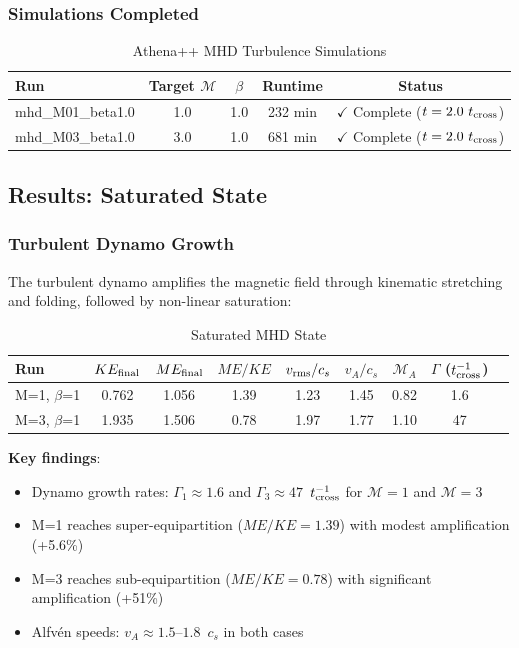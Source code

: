 \documentclass[11pt,a4paper]{article}
\begin{document}
\subsubsection{Simulations Completed}

\begin{table}[H]
\centering
\caption{Athena++ MHD Turbulence Simulations}
\begin{tabular}{lcccc}
\toprule
Run & Target $\mathcal{M}$ & $\beta$ & Runtime & Status \\
\midrule
mhd\_M01\_beta1.0 & 1.0 & 1.0 & 232 min & $\checkmark$ Complete ($t = 2.0~t_{\rm cross}$) \\
mhd\_M03\_beta1.0 & 3.0 & 1.0 & 681 min & $\checkmark$ Complete ($t = 2.0~t_{\rm cross}$) \\
\bottomrule
\end{tabular}
\end{table}

\subsection{Results: Saturated State}

\subsubsection{Turbulent Dynamo Growth}

The turbulent dynamo amplifies the magnetic field through kinematic stretching and folding, followed by non-linear saturation:

\begin{table}[H]
\centering
\caption{Saturated MHD State}
\begin{tabular}{lcccccccc}
\toprule
Run & $KE_{\rm final}$ & $ME_{\rm final}$ & $ME/KE$ & $v_{\rm rms}/c_s$ & $v_A/c_s$ & $\mathcal{M}_A$ & $\Gamma$ ($t_{\rm cross}^{-1}$) \\
\midrule
M=1, $\beta$=1 & 0.762 & 1.056 & 1.39 & 1.23 & 1.45 & 0.82 & 1.6 \\
M=3, $\beta$=1 & 1.935 & 1.506 & 0.78 & 1.97 & 1.77 & 1.10 & 47 \\
\bottomrule
\end{tabular}
\end{table}

\textbf{Key findings}:
\begin{itemize}
    \item Dynamo growth rates: $\Gamma_1 \approx 1.6$ and $\Gamma_3 \approx 47$~$t_{\rm cross}^{-1}$ for $\mathcal{M}=1$ and $\mathcal{M}=3$
    \item M=1 reaches super-equipartition ($ME/KE = 1.39$) with modest amplification (+5.6\%)
    \item M=3 reaches sub-equipartition ($ME/KE = 0.78$) with significant amplification (+51\%)
    \item Alfv\'en speeds: $v_A \approx 1.5$--$1.8$~$c_s$ in both cases
\end{itemize}
\end{document}

